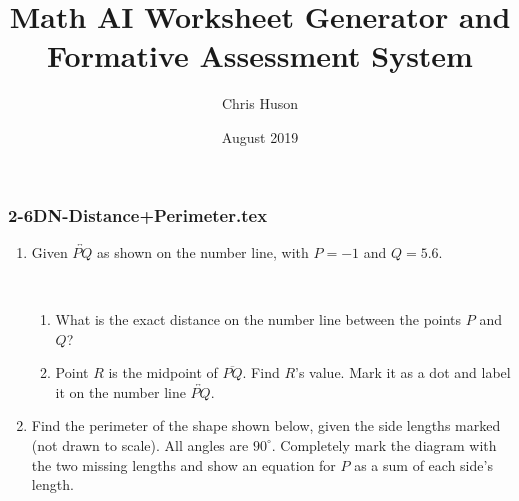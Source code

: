 \documentclass[12pt, twoside]{article}
\title{Math AI Worksheet Generator and Formative Assessment System}
\author{Chris Huson}
\date{August 2019}
\begin{document}
\subsubsection*{2-6DN-Distance+Perimeter.tex}
\begin{enumerate}
\item Given $\overleftrightarrow{PQ}$ as shown on the number line, with $P=-1$ and $Q=5.6$. \\[20pt] %
     \\ \smallskip
    \begin{enumerate}
      \item What is the exact distance on the number line between the points $P$ and $Q$?  \vspace{2cm}
      \item Point $R$ is the midpoint of $\overline{PQ}$. Find $R$'s value. Mark it as a dot and label it on the number line $\overleftrightarrow{PQ}$.
    \end{enumerate}  \vspace{4cm}  

\item Find the perimeter of the shape shown below, given the side lengths marked (not drawn to scale). All angles are $90^\circ$. Completely mark the diagram with the two missing lengths and show an equation for $P$ as a sum of each side's length.
    \vspace{1cm} 
    \begin{flushleft}
    \end{flushleft} \vspace{1cm}  


\end{enumerate}
\end{document}

